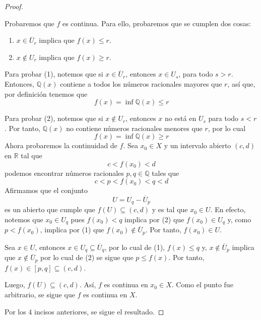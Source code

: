 \documentclass[12pt]{report}
\newcounter{it}
\theoremstyle{largebreak}
\newcommand{\Cls}[1]{\ensuremath{\overline{#1}}}
\begin{document}
\begin{proof}
\begin{enumerate}
            Probaremos que $f$ es continua. Para ello, probaremos que se cumplen dos cosas:
            \begin{enumerate}
                \item $x\in\Cls{U}_r$ implica que $f(x)\leq r$.
                \item $x\notin U_r$ implica que $f(x)\geq r$.
            \end{enumerate}
            Para probar (1), notemos que si $x\in\Cls{U}_r$, entonces $x\in U_s$, para todo $s>r$. Entonces, $\mathbb{Q}(x)$ contiene a todos los números racionales mayores que $r$, así que, por definición tenemos que
            \begin{equation*}
                f(x)=\inf\mathbb{Q}(x)\leq r
            \end{equation*}

            Para probar (2), notemos que si $x\notin U_r$, entonces $x$ no está en $U_s$ para todo $s<r$. Por tanto, $\mathbb{Q}(x)$ no contiene números racionales menores que $r$, por lo cual
            \begin{equation*}
                f(x)=\inf\mathbb{Q}(x)\geq r
            \end{equation*}
            Ahora probaremos la continuidad de $f$. Sea $x_0\in X$ y un intervalo abierto $(c,d)$ en $\mathbb{R}$ tal que
            \begin{equation*}
                c<f(x_0)<d
            \end{equation*}
            podemos encontrar números racionales $p,q\in\mathbb{Q}$ tales que
            \begin{equation*}
                c<p<f(x_0)<q<d
            \end{equation*}
            Afirmamos que el conjunto
            \begin{equation*}
                U=U_q-\Cls{U}_p
            \end{equation*}
            es un abierto que cumple que $f(U)\subseteq(c,d)$ y es tal que $x_0\in U$. En efecto, notemos que $x_0\in U_q$ pues $f(x_0)<q$ implica por (2) que $f(x_0)\in U_q$ y, como $p<f(x_0)$, implica por (1) que $f(x_0)\notin \Cls{U}_p$. Por tanto, $f(x_0)\in U$.

            Sea $x\in U$, entonces $x\in U_q\subseteq \Cls{U}_q$, por lo cual de (1), $f(x)\leq q$ y, $x\notin \Cls{U}_p$ implica que $x\notin\Cls{U}_p$ por lo cual de (2) se sigue que $p\leq f(x)$. Por tanto, $f(x)\in[p,q]\subseteq (c,d)$.

            Luego, $f(U)\subseteq(c,d)$. Así, $f$ es continua en $x_0\in X$. Como el punto fue arbitrario, se sigue que $f$ es continua en $X$.
        \end{enumerate}
        Por los 4 incisos anteriores, se sigue el resultado.


\end{proof}
\end{document}
